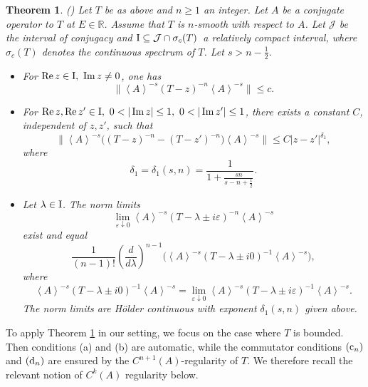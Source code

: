 \documentclass[reqno, 11pt]{amsart}
\newtheorem{theorem}[definition]{Theorem}
\newcommand\R{\mathbb{R}}
\newcommand\mcaJ{\mathcal{J}}
\numberwithin{equation}{section}
\begin{document}
\begin{theorem}\label{Resol-Smoo}
{\rm(\cite[Theorem 2.2]{JMP84})} Let $T$ be as above and $n\geq1$ an integer. Let $A$ be a conjugate operator to $T$ at $E\in\R$. Assume that $T$ is $n$-smooth with respect to $A$. Let $\mcaJ$ be the interval of conjugacy and ${\rm I}\subseteq \mcaJ\cap\sigma_c(T)$~a relatively compact interval, where $\sigma_c(T)$ denotes the continuous spectrum of $T$. Let $s>n-\frac{1}{2}$.
 \begin{itemize}
\item [{\rm (i)}]For $\operatorname{Re}z\in {\rm I},\ \operatorname{Im}z\neq0$, one has
$$\|\left<A\right>^{-s}(T-z)^{-n}\left<A\right>^{-s}\|\leq c.$$
\item [{\rm (ii)}] For $\operatorname{Re}z,\operatorname{Re}z'\in {\rm I},\ 0<|\operatorname{Im}z|\leq1,\ 0<|\operatorname{Im}z'|\leq1$, there exists a constant $C$, independent of $z,z'$, such that
    $$\|\left<A\right>^{-s}\big((T-z)^{-n}-(T-z')^{-n}\big)\left<A\right>^{-s}\|\leq C|z-z'|^{\delta_1},$$
    where
    \begin{equation}\label{delta}
    \delta_1=\delta_1(s,n)=\frac{1}{1+\frac{sn}{s-n+\frac{1}{2}}}.
    \end{equation}
\item [{\rm (iii)}] Let $\lambda\in {\rm I}$. The norm limits
$$\lim\limits_{\varepsilon\downarrow0}\left<A\right>^{-s}(T-\lambda\pm i\varepsilon)^{-n}\left<A\right>^{-s}$$
exist and equal
$$\frac{1}{(n-1)!}\left(\frac{d}{d\lambda}\right)^{n-1}\big(\left<A\right>^{-s}(T-\lambda\pm i0)^{-1}\left<A\right>^{-s}\big),$$
where
$$\left<A\right>^{-s}(T-\lambda\pm i0)^{-1}\left<A\right>^{-s}=\lim\limits_{\varepsilon\downarrow0}\left<A\right>^{-s}(T-\lambda\pm i\varepsilon)^{-1}\left<A\right>^{-s}.$$
The norm limits are H\"{o}lder continuous with exponent $\delta_1(s,n)$ given above.
\end{itemize}
\end{theorem}
To apply Theorem \ref{Resol-Smoo} in our setting, we focus on the case where $T$ is bounded. Then conditions (a) and (b) are automatic, while the commutator conditions $({\rm c}_n)$ and $({\rm d}_n)$ are ensured by the $C^{n+1}(A)$-regularity of $T$. We therefore recall the relevant notion of $C^k(A)$ regularity below.
\end{document}
